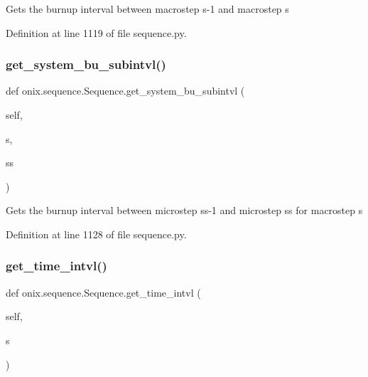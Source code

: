 \begin{DoxyVerb}Gets the burnup interval between macrostep s-1 and macrostep s\end{DoxyVerb}
 

Definition at line 1119 of file sequence.\+py.

\mbox{\label{classonix_1_1sequence_1_1Sequence_ad7f3dab9f85da67314654f68923f7812}} 
\subsubsection{\texorpdfstring{get\+\_\+system\+\_\+bu\+\_\+subintvl()}{get\_system\_bu\_subintvl()}}
{\footnotesize\ttfamily def onix.\+sequence.\+Sequence.\+get\+\_\+system\+\_\+bu\+\_\+subintvl (\begin{DoxyParamCaption}\item[{}]{self,  }\item[{}]{s,  }\item[{}]{ss }\end{DoxyParamCaption})}

\begin{DoxyVerb}Gets the burnup interval between microstep ss-1 and microstep ss for macrostep s\end{DoxyVerb}
 

Definition at line 1128 of file sequence.\+py.

\mbox{\label{classonix_1_1sequence_1_1Sequence_a418b4785a15e01ba6ac87465882ad75a}} 
\subsubsection{\texorpdfstring{get\+\_\+time\+\_\+intvl()}{get\_time\_intvl()}}
{\footnotesize\ttfamily def onix.\+sequence.\+Sequence.\+get\+\_\+time\+\_\+intvl (\begin{DoxyParamCaption}\item[{}]{self,  }\item[{}]{s }\end{DoxyParamCaption})}

